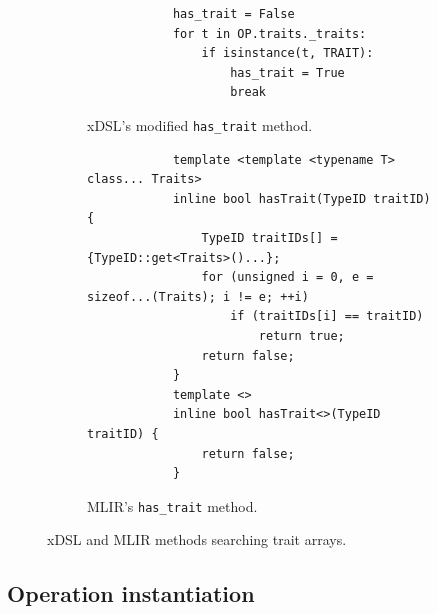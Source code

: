 \begin{figure}[H]
    \centering
    \begin{subfigure}[b]{0.45\textwidth}
       \centering
        \begin{verbatim}
            has_trait = False
            for t in OP.traits._traits:
                if isinstance(t, TRAIT):
                    has_trait = True
                    break
        \end{verbatim}
        \footnotesize\vspace{5.5em}
        \captionsetup{name=Listing}
        \caption{xDSL's modified \texttt{has_trait} method.}
        \label{listing:ubenchmark-trait-checks-both-xdsl}
    \end{subfigure}
    \hfill
    \begin{subfigure}[b]{0.45\textwidth}
        \centering
        \begin{verbatim}
            template <template <typename T> class... Traits>
            inline bool hasTrait(TypeID traitID) {
                TypeID traitIDs[] = {TypeID::get<Traits>()...};
                for (unsigned i = 0, e = sizeof...(Traits); i != e; ++i)
                    if (traitIDs[i] == traitID)
                        return true;
                return false;
            }
            template <>
            inline bool hasTrait<>(TypeID traitID) {
                return false;
            }
        \end{verbatim}
        \captionsetup{name=Listing}
        \caption{MLIR's \texttt{has_trait} method.}
        \label{listing:ubenchmark-trait-checks-both-mlir}
    \end{subfigure}
    \vspace{1em}
    \captionsetup{name=Listing}
    \caption{xDSL and MLIR methods searching trait arrays.}
    \label{listing:ubenchmark-trait-checks-both}
\end{figure}


\subsection{Operation instantiation}
\label{sec:specialising-ubenchmarks-instantiation}










